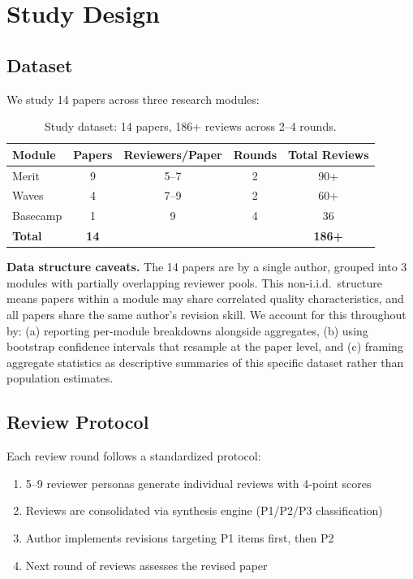 \section{Study Design}

\subsection{Dataset}

We study 14 papers across three research modules:

\begin{table}[h]
\centering
\small
\begin{tabular}{lcccc}
\toprule
Module & Papers & Reviewers/Paper & Rounds & Total Reviews \\
\midrule
Merit & 9 & 5--7 & 2 & 90+ \\
Waves & 4 & 7--9 & 2 & 60+ \\
Basecamp & 1 & 9 & 4 & 36 \\
\midrule
\textbf{Total} & \textbf{14} & & & \textbf{186+} \\
\bottomrule
\end{tabular}
\caption{Study dataset: 14 papers, 186+ reviews across 2--4 rounds.}
\end{table}

\textbf{Data structure caveats.} The 14 papers are by a single author, grouped into 3 modules with partially overlapping reviewer pools. This non-i.i.d.\ structure means papers within a module may share correlated quality characteristics, and all papers share the same author's revision skill. We account for this throughout by: (a) reporting per-module breakdowns alongside aggregates, (b) using bootstrap confidence intervals that resample at the paper level, and (c) framing aggregate statistics as descriptive summaries of this specific dataset rather than population estimates.

\subsection{Review Protocol}

Each review round follows a standardized protocol:
\begin{enumerate}
    \item 5--9 reviewer personas generate individual reviews with 4-point scores
    \item Reviews are consolidated via synthesis engine (P1/P2/P3 classification)
    \item Author implements revisions targeting P1 items first, then P2
    \item Next round of reviews assesses the revised paper
\end{enumerate}

